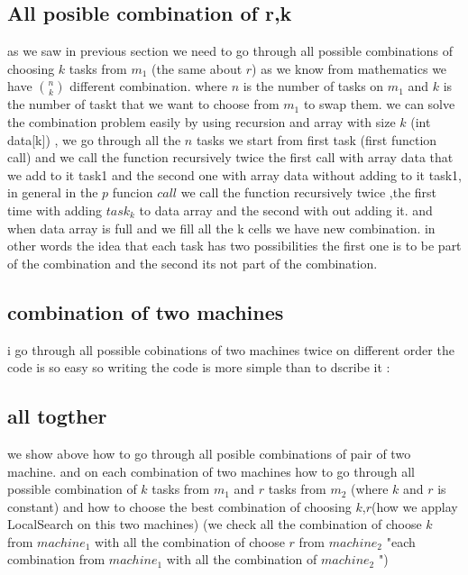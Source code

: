 \documentclass[11pt,fullpage]{article}
\begin{document}
\subsection{All posible combination of r,k}
as we saw in previous section we need to go through all possible  combinations of choosing $k$ tasks from $m_1$ (the same about $r$) as we know from mathematics we have  $\binom{n}{k}$ different combination. where $n$ is the number of tasks on $m_1$ and $k$ is the number of taskt that we want to choose from $m_1$ to swap them.\newline
we can solve the combination problem easily by using recursion and array with size $k$  (int data[k]) , we go through all the $n$ tasks we start from first task (first function call) and we call the function recursively twice the first call with array data that we add to it task1 and the second one with array data without adding to it task1, in general in the $p$ funcion $call$ we call the function recursively twice ,the first time with adding $task_k$ to data array and the second with out adding it.
and when data array is full and we fill all the k cells we have new  combination.\newline
in other words the idea that each task has two possibilities the first one is to be part of the combination and the second its not part of the combination.
\subsection{combination of two machines}
i go through all possible cobinations of two machines twice on different order the code is so easy so writing the code is more simple than to dscribe it :\newline 

\subsection{all togther} 
we show above how to go  through all posible combinations of pair of two machine.  and on each  combination of two machines  how to go through all possible combination of $k$ tasks from $m_1$ and $r$ tasks from $m_2$ (where $k$ and $r$ is constant) and how to choose the best combination of choosing $k$,$r$(how we applay LocalSearch on this two machines) (we check all the combination of choose $k$ from $machine_1$ with all the combination of choose $r$ from $machine_2$ "each combination from $machine_1$ with all the combination of $machine_2$ ")
\end{document}
